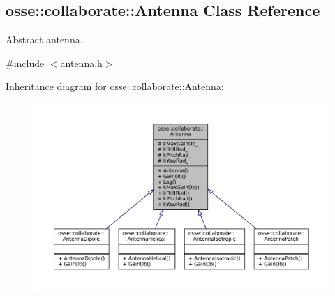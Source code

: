 \hypertarget{classosse_1_1collaborate_1_1_antenna}{}\subsection{osse\+:\+:collaborate\+:\+:Antenna Class Reference}
\label{classosse_1_1collaborate_1_1_antenna}


Abstract antenna.  




{\ttfamily \#include $<$antenna.\+h$>$}



Inheritance diagram for osse\+:\+:collaborate\+:\+:Antenna\+:
\nopagebreak
\begin{figure}[H]
\begin{center}
\leavevmode
\includegraphics[width=350pt]{classosse_1_1collaborate_1_1_antenna__inherit__graph}
\end{center}
\end{figure}
